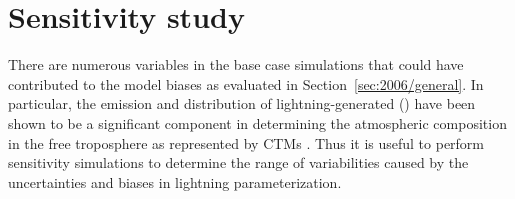 %

\section{Sensitivity study}\label{sec:2006/sens}

There are numerous variables in the base case simulations that could have contributed to the model biases as evaluated in Section~\ref{sec:2006/general}. In
particular, the emission and distribution of lightning-generated  (\lnox) have been shown to be a significant component in determining the
atmospheric composition in the free troposphere as represented by CTMs \citep{Labrador:2005uq,Cooper:2009nx,Ott:2010lo}. Thus it is useful to perform
sensitivity simulations to determine the range of variabilities caused by the uncertainties and biases in lightning parameterization.

